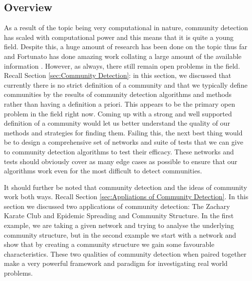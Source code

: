 \subsection{Overview}
As a result of the topic being very computational in nature, community detection has scaled with computational power and this means that it is quite a young field. Despite this, a huge amount of research has been done on the topic thus far and Fortunato has done amazing work collating a large amount of the available information \cite{fortunato}. However, as always, there still remain open problems in the field. Recall Section \ref{sec:Community Detection}: in this section, we discussed that currently there is no strict definition of a community and that we typically define communities by the results of community detection algorithms and methods rather than having a definition a priori. This appears to be the primary open problem in the field right now. Coming up with a strong and well supported definition of a community would let us better understand the quality of our methods and strategies for finding them. Failing this, the next best thing would be to design a comprehensive set of networks and suite of tests that we can give to community detection algorithms to test their efficacy. These networks and tests should obviously cover as many edge cases as possible to ensure that our algorithms work even for the most difficult to detect communities. 

It should further be noted that community detection and the ideas of community work both ways. Recall Section \ref{sec:Appliations of Community Detection}. In this section we discussed two applications of community detection: The Zachary Karate Club and Epidemic Spreading and Community Structure. In the first example, we are taking a given network and trying to analyse the underlying community structure, but in the second example we start with a network and show that by creating a community structure we gain some favourable characteristics. These two qualities of community detection when paired together make a very powerful framework and paradigm for investigating real world problems.

